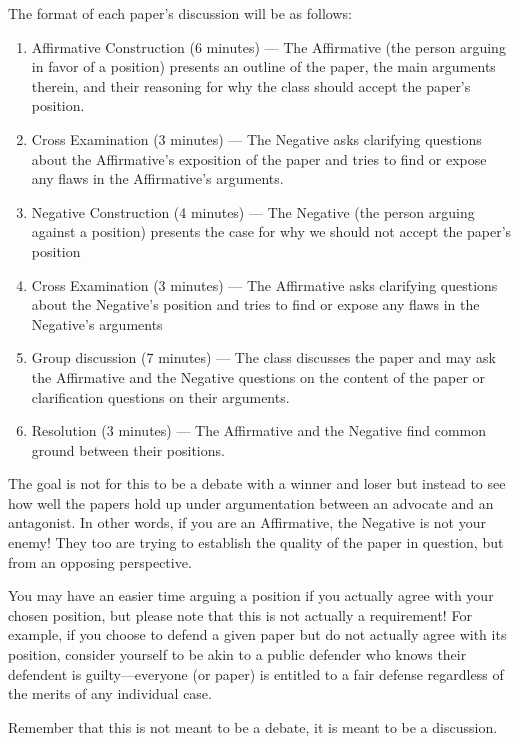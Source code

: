 \documentclass[11pt]{article}
\begin{document}
The format of each paper's discussion will be as follows:
\begin{enumerate}
    \item Affirmative Construction (6 minutes) --- The Affirmative (the person arguing in favor of a position) presents an outline of the paper, the main arguments therein, and their reasoning for why the class should accept the paper's position. 
    \item Cross Examination (3 minutes) --- The Negative asks clarifying questions about the Affirmative's exposition of the paper and tries to find or expose any flaws in the Affirmative's arguments. 
    \item Negative Construction (4 minutes) --- The Negative (the person arguing against a position) presents the case for why we should not accept the paper's position
    \item Cross Examination (3 minutes) --- The Affirmative asks clarifying questions about the Negative's position and tries to find or expose any flaws in the Negative's arguments
    \item Group discussion (7 minutes) --- The class discusses the paper and may ask the Affirmative and the Negative questions on the content of the paper or clarification questions on their arguments. 
    \item Resolution (3 minutes) --- The Affirmative and the Negative find common ground between their positions. 
\end{enumerate}

The goal is not for this to be a debate with a winner and loser but instead to see how well the papers hold up under argumentation between an advocate and an antagonist.
In other words, if you are an Affirmative, the Negative is not your enemy!
They too are trying to establish the quality of the paper in question, but from an opposing perspective.

You may have an easier time arguing a position if you actually agree with your chosen position, but please note that this is not actually a requirement!
For example, if you choose to defend a given paper but do not actually agree with its position, consider yourself to be akin to a public defender who knows their defendent is guilty---everyone (or paper) is entitled to a fair defense regardless of the merits of any individual case. 

Remember that this is not meant to be a debate, it is meant to be a discussion. 
\end{document}
